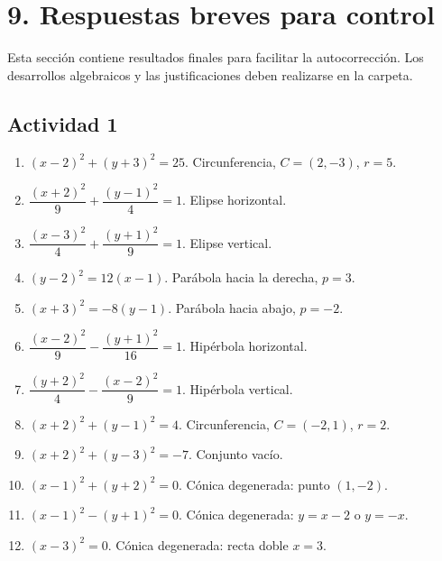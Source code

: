 \documentclass[11pt]{article}
\def\identacion{-2.5mm}%
\begin{document}
 
\section*{9. Respuestas breves para control}

\begin{mdframed}[style=ObsSty,frametitle={Uso sugerido}]
Esta sección contiene resultados finales para facilitar la autocorrección. Los desarrollos algebraicos y las justificaciones deben realizarse en la carpeta.
\end{mdframed}

\subsection*{Actividad 1}

\begin{enumerate}[\hspace*{\identacion}1)]
\item $(x-2)^2+(y+3)^2=25$. Circunferencia, $C=(2,-3)$, $r=5$.

\item $\dfrac{(x+2)^2}{9}+\dfrac{(y-1)^2}{4}=1$. Elipse horizontal.

\item $\dfrac{(x-3)^2}{4}+\dfrac{(y+1)^2}{9}=1$. Elipse vertical.

\item $(y-2)^2=12(x-1)$. Parábola hacia la derecha, $p=3$.

\item $(x+3)^2=-8(y-1)$. Parábola hacia abajo, $p=-2$.

\item $\dfrac{(x-2)^2}{9}-\dfrac{(y+1)^2}{16}=1$. Hipérbola horizontal.

\item $\dfrac{(y+2)^2}{4}-\dfrac{(x-2)^2}{9}=1$. Hipérbola vertical.

\item $(x+2)^2+(y-1)^2=4$. Circunferencia, $C=(-2,1)$, $r=2$.

\item $(x+2)^2+(y-3)^2=-7$. Conjunto vacío.

\item $(x-1)^2+(y+2)^2=0$. Cónica degenerada: punto $(1,-2)$.

\item $(x-1)^2-(y+1)^2=0$. Cónica degenerada: $y=x-2$ o $y=-x$.

\item $(x-3)^2=0$. Cónica degenerada: recta doble $x=3$.
\end{enumerate}
\end{document}
